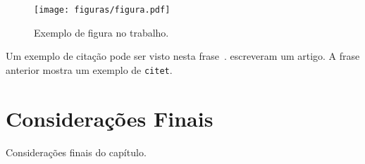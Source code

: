 \begin{figure}[!htb]
\texttt{[image: figuras/figura.pdf]}
\caption{Exemplo de figura no trabalho.\label{fig:figura}}
\end{figure}

Um exemplo de citação pode ser visto nesta frase~\cite{Furnas1987}. \citet{Bajracharya2010} escreveram um artigo. A frase anterior mostra um exemplo de \texttt{citet}.


\section{Considerações Finais}
\label{sec:CFpoa}


Considerações finais do capítulo. 